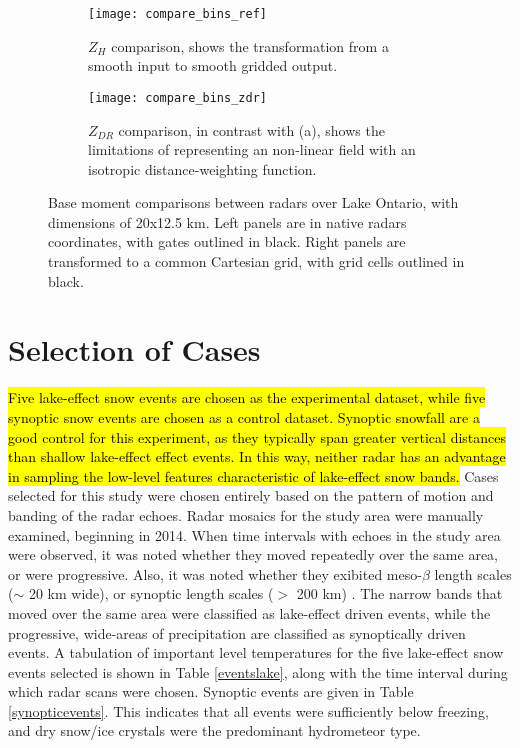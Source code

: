 \begin{figure}[t!]
\centering
   \begin{subfigure}{1.0\textwidth} \centering
     \texttt{[image: compare\_bins\_ref]}
     \caption{$Z_H$ comparison, shows the transformation from a smooth input to smooth gridded output.}\label{fig:compare_ref}
   \end{subfigure}
   \begin{subfigure}{1.0\textwidth} \centering
     \texttt{[image: compare\_bins\_zdr]}
     \caption{$Z_{DR}$ comparison, in contrast with (a), shows the limitations of representing an non-linear field with an isotropic distance-weighting
     function. }\label{fig:compare_zdr}
   \end{subfigure}
\caption{Base moment comparisons between radars over Lake Ontario, with dimensions of 20x12.5 km. Left panels are in native radars coordinates, with gates
outlined in black. Right panels are transformed to a common Cartesian grid, with grid cells outlined in black.} \label{fig:compare_bins}
\end{figure}

\section{Selection of Cases}
\hl{Five lake-effect snow events are chosen as the experimental dataset, while five synoptic snow events are chosen as a control dataset. Synoptic snowfall are a good control for this experiment, as they typically span greater vertical distances than shallow lake-effect effect events. In this way, neither radar has an advantage in sampling the low-level features characteristic of lake-effect snow bands.}
Cases selected for this study were chosen entirely based on the pattern of motion and banding of the radar
echoes. Radar mosaics for the study area were
manually examined, beginning in 2014. When time intervals with echoes in the study area were observed, it was
noted whether they moved repeatedly over the same area,
or were progressive.  Also, it was noted whether they exibited meso-$\beta$ length scales ($\sim$ 20 km wide),
or synoptic length scales ($>$ 200 km) \citep{Orlanski1975}. The narrow bands that moved over the same area
were classified as lake-effect driven events, while the progressive, wide-areas of precipitation are classified as
synoptically driven events. A tabulation of important level temperatures for the five lake-effect snow events selected
is shown in Table \ref{eventslake}, along with the time interval during which radar scans were chosen. Synoptic
events are given in Table \ref{synopticevents}. This indicates that all events were sufficiently below freezing, and
dry snow/ice crystals were the predominant hydrometeor type.

